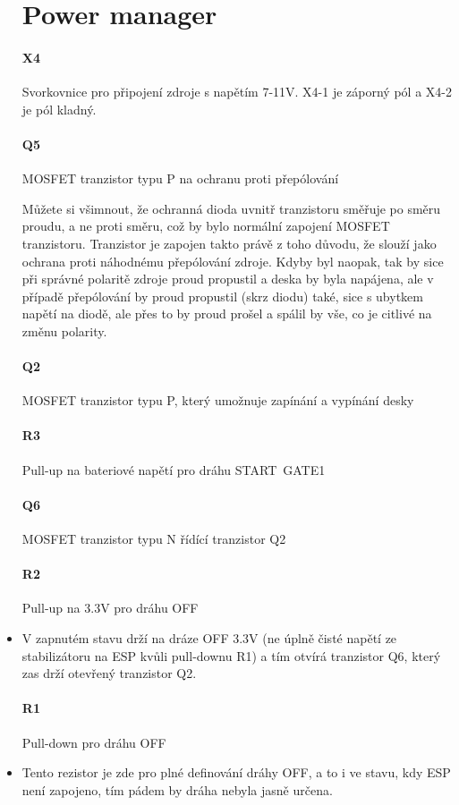 \documentclass{template/socthesis}
\begin{document}
\begin{itemize}
	\section{Power manager}
	
	\paragraph*{X4}
	Svorkovnice pro připojení zdroje s napětím 7-11V. X4-1 je záporný pól a X4-2 je pól kladný.
	\paragraph*{Q5}
	MOSFET tranzistor typu P na ochranu proti přepólování
	
	Můžete si všimnout, že ochranná dioda uvnitř tranzistoru směřuje po směru proudu, a ne proti směru, což by bylo normální zapojení MOSFET tranzistoru.
	Tranzistor je zapojen takto právě z toho důvodu, že slouží jako ochrana proti náhodnému přepólování zdroje. Kdyby byl naopak, tak by sice při správné polaritě zdroje proud propustil a deska by byla napájena, ale v případě přepólování by proud propustil (skrz diodu) také, sice s ubytkem napětí na diodě, ale přes to by proud prošel a spálil by vše, co je citlivé na změnu polarity.
	\paragraph*{Q2}
	MOSFET tranzistor typu P, který umožnuje zapínání a vypínání desky
	\paragraph*{R3}
	Pull-up na bateriové napětí pro dráhu START~GATE1
	\paragraph*{Q6}
	MOSFET tranzistor typu N řídící tranzistor Q2
	\paragraph{R2}
	Pull-up na 3.3V pro dráhu OFF
	\item V zapnutém stavu drží na dráze OFF 3.3V
	(ne úplně čisté napětí ze stabilizátoru na ESP kvůli pull-downu R1) a tím otvírá tranzistor Q6, který zas drží otevřený tranzistor Q2.
	
	\paragraph*{R1}
	Pull-down pro dráhu OFF
	\item Tento rezistor je zde pro plné definování dráhy OFF,
	a to i ve stavu, kdy ESP není zapojeno, tím pádem by dráha nebyla jasně určena.
	

\end{itemize}
\end{document}
